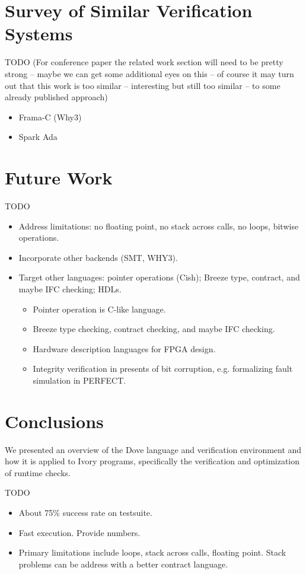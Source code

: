 \documentclass{article}
\begin{document}
\section{Survey of Similar Verification Systems}
TODO
(For conference paper the related work section will need to be 
pretty strong -- maybe we can get some additional eyes on this -- 
of course it may turn out that this work is too similar -- interesting
but still too similar -- to some already published approach)
\begin{itemize}
  \item Frama-C (Why3)
  \item Spark Ada
\end{itemize}

\section{Future Work}
TODO
\begin{itemize}
  \item Address limitations: no floating point, no stack across calls, no loops, bitwise operations.
  \item Incorporate other backends (SMT, WHY3).
  \item Target other languages: pointer operations (Cish); Breeze type, contract, and maybe IFC checking; HDLs.
  \begin{itemize}
    \item Pointer operation is C-like language.
    \item Breeze type checking, contract checking, and maybe IFC checking.
    \item Hardware description languages for FPGA design.
    \item Integrity verification in presents of bit corruption, e.g. formalizing fault simulation in PERFECT.
  \end{itemize}
\end{itemize}

\section{Conclusions}
We presented an overview of the Dove language and verification environment
and how it is applied to Ivory programs,
specifically the verification and optimization of runtime checks.

TODO
\begin{itemize}
  \item About 75\% success rate on testsuite.
  \item Fast execution.  Provide numbers.
  \item Primary limitations include loops, stack across calls, floating point.  Stack problems can be address with a better contract language.
\end{itemize}
\end{document}
